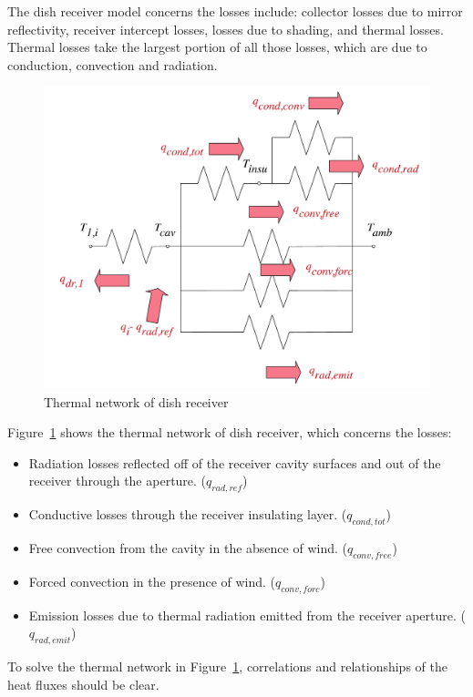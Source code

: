 The dish receiver model concerns the losses include: collector losses due to mirror reflectivity, receiver intercept losses, losses due to shading, and thermal losses. Thermal losses take the largest portion of all those losses, which are due to conduction, convection and radiation.
\noindent \begin{figure}[ht!]
\begin{center}
	\includegraphics[width = 0.5\columnwidth]{fig/thermalLosses.pdf}
	\caption{Thermal network of dish receiver}
	\label{fig:thermal-lose}
\end{center}
\end{figure}
Figure~\ref{fig:thermal-lose} shows the thermal network of dish receiver, which concerns the losses:
\begin{itemize}
	\item Radiation losses reflected off of the receiver cavity surfaces and out of the receiver through the aperture. ($q_{rad,ref}$)
	\item Conductive losses through the receiver insulating layer. ($q_{cond,tot}$)
	\item Free convection from the cavity in the absence of wind. ($q_{conv,free}$)
	\item Forced convection in the presence of wind. ($q_{conv,forc}$)
	\item Emission losses due to thermal radiation emitted from the receiver aperture. ($q_{rad,emit}$)
\end{itemize}

To solve the thermal network in Figure~\ref{fig:thermal-lose}, correlations and relationships of the heat fluxes should be clear.

